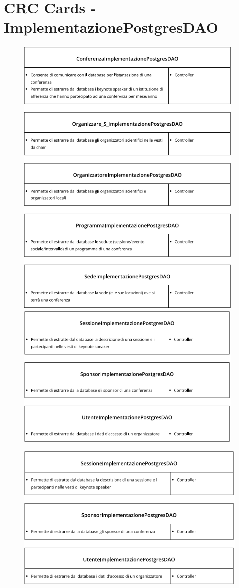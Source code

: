 \documentclass[a4paper,italian,10pt,openany]{book}
\begin{document}
\section{CRC Cards - ImplementazionePostgresDAO}
\begin{figure}[h!]
\centering
\includegraphics[width=11cm]{crc_card_dao1}
\includegraphics[width=11cm]{crc_card_dao2}
\end{figure}
\begin{figure}[h!]
\centering
\includegraphics[width=13cm]{crc_card_dao2}
\end{figure}
\newpage
\end{document}
